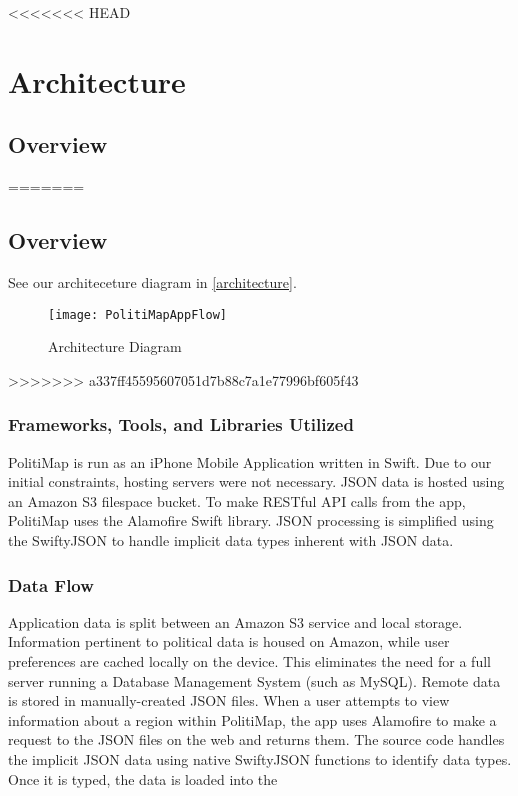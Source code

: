 <<<<<<< HEAD
\section{Architecture}
% 
\subsection{Overview}
=======
\subsection{Overview}
See our architeceture diagram in \vref{architecture}.
\begin{figure}
\begin{center}
\texttt{[image: PolitiMapAppFlow]}
\end{center}
\caption{\label{architecture}Architecture Diagram}
\end{figure}
>>>>>>> a337ff45595607051d7b88c7a1e77996bf605f43
\subsubsection{Frameworks, Tools, and Libraries Utilized}
PolitiMap is run as an iPhone Mobile Application written in Swift. Due
to our initial constraints, hosting servers were not necessary. JSON data
is hosted using an Amazon S3 filespace bucket. To make RESTful API calls
from the app, PolitiMap uses the Alamofire Swift library. JSON processing
is simplified using the SwiftyJSON to handle implicit data types inherent
with JSON data.
\subsubsection{Data Flow}
Application data is split between an Amazon S3 service and local storage.
Information pertinent to political data is housed on Amazon, while user
preferences are cached locally on the device. This eliminates the need for
a full server running a Database Management System (such as MySQL). Remote
data is stored in manually-created JSON files. When a user attempts to view
information about a region within PolitiMap, the app uses Alamofire
to make a request to the JSON files on the web and returns them. The source
code handles the implicit JSON data using native SwiftyJSON functions to
identify data types. Once it is typed, the data is loaded into the 
